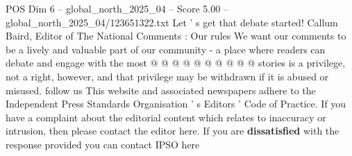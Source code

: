 \begin{textsample}{POS Dim 6 – global\_north\_2025\_04 – Score 5.00 – global\_north\_2025\_04/123651322.txt}
Let ' s get that debate started!
Callum Baird, Editor of The National Comments : Our rules We want our comments to be a lively and valuable part of our community - a place where readers can debate and engage with the most @ @ @ @ @ @ @ @ @ @ stories is a privilege, not a right, however, and that privilege may be withdrawn if it is abused or misused. follow us This website and associated newspapers adhere to the Independent Press Standards Organisation ' s Editors ' Code of Practice.
If you have a complaint about the editorial content which relates to inaccuracy or intrusion, then please contact the editor here.
If you are \textbf{dissatisfied} with the response provided you can contact IPSO here

\end{textsample}
